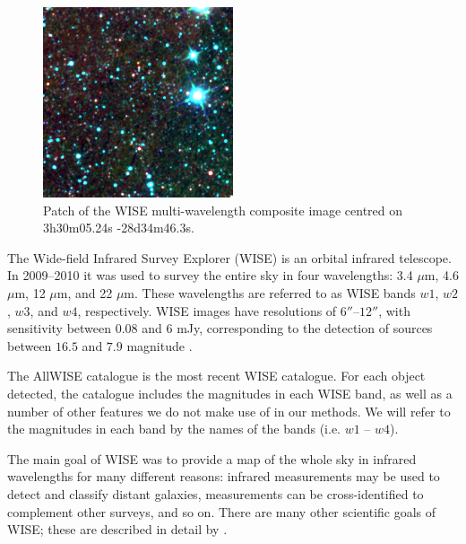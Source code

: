             \begin{figure}
                \centering
                \includegraphics[width=0.5\textwidth]
                    {images/WISE_3h30m05.24s-28d34m46.3s.png}
                \caption{Patch of the WISE multi-wavelength composite image
                    centred on 3h30m05.24s -28d34m46.3s.}
                \label{fig:wise}
            \end{figure}

            The Wide-field Infrared Survey Explorer (WISE) is an orbital
            infrared telescope. In 2009--2010 it was used to survey the entire
            sky in four wavelengths: 3.4 $\mu$m, 4.6 $\mu$m, 12 $\mu$m, and 22
            $\mu$m. These wavelengths are referred to as WISE bands $w1$, $w2$,
            $w3$, and $w4$, respectively. WISE images have resolutions of
            $6''$--$12''$, with sensitivity between $0.08$ and $6$ mJy,
            corresponding to the detection of sources between $16.5$ and $7.9$
            magnitude \citep{wright10}.

            The AllWISE catalogue \citep{cutri13} is the most recent WISE
            catalogue. For each object detected, the catalogue includes the
            magnitudes in each WISE band, as well as a number of other features
            we do not make use of in our methods. We will refer to the
            magnitudes in each band by the names of the bands (i.e. $w1$ --
            $w4$).

            The main goal of WISE was to provide a map of the whole sky in
            infrared wavelengths for many different reasons: infrared
            measurements may be used to detect and classify distant galaxies,
            measurements can be cross-identified to complement other surveys,
            and so on. There are many other scientific goals of WISE; these are
            described in detail by \citet{wright10}.

